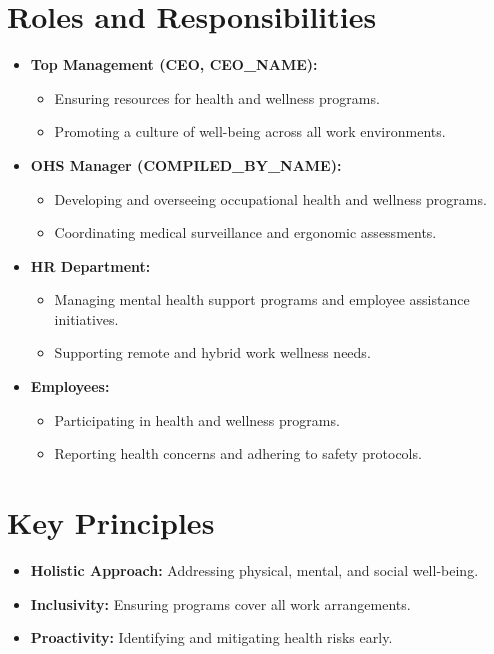 \documentclass[12pt]{article}
\begin{document}
\section{Roles and Responsibilities}
\begin{itemize}
    \item \textbf{Top Management (CEO, {{CEO_NAME}}):}
    \begin{itemize}
        \item Ensuring resources for health and wellness programs.
        \item Promoting a culture of well-being across all work environments.
    \end{itemize}
    \item \textbf{OHS Manager ({{COMPILED_BY_NAME}}):}
    \begin{itemize}
        \item Developing and overseeing occupational health and wellness programs.
        \item Coordinating medical surveillance and ergonomic assessments.
    \end{itemize}
    \item \textbf{HR Department:}
    \begin{itemize}
        \item Managing mental health support programs and employee assistance initiatives.
        \item Supporting remote and hybrid work wellness needs.
    \end{itemize}
    \item \textbf{Employees:}
    \begin{itemize}
        \item Participating in health and wellness programs.
        \item Reporting health concerns and adhering to safety protocols.
    \end{itemize}
\end{itemize}

\section{Key Principles}
\begin{itemize}
    \item \textbf{Holistic Approach:} Addressing physical, mental, and social well-being.
    \item \textbf{Inclusivity:} Ensuring programs cover all work arrangements.
    \item \textbf{Proactivity:} Identifying and mitigating health risks early.
\end{itemize}
\end{document}
